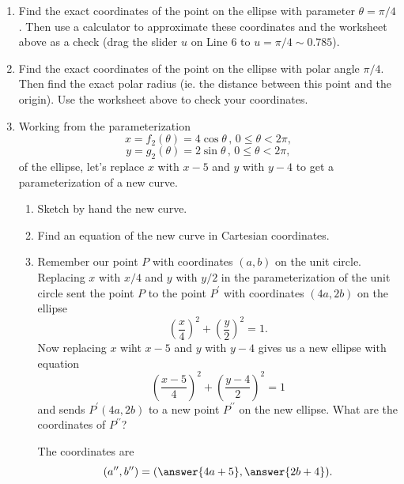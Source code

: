 \documentclass{ximera}
\begin{document}
\begin{example}
\begin{enumerate}
\item Find the exact coordinates of the point on the ellipse with parameter $\theta=\pi/4$. Then use a calculator to approximate these coordinates and the worksheet above as a check (drag the slider $u$ on Line 6 to $u=\pi/4 \sim 0.785$).

\item Find the exact coordinates of the point on the ellipse with polar angle $\pi/4$. Then find the exact polar radius (ie. the distance between this point and the origin). Use the worksheet above to check your coordinates.

\item Working from the parameterization 
\[ 
     x = f_2 (\theta) = 4\cos\theta \, , \, 0\leq \theta <2\pi ,
\]
\[
   y = g_2 (\theta) = 2\sin\theta \, , \, 0\leq \theta <2\pi ,
\]
of the ellipse, let's replace $x$ with $x-5$ and $y$ with $y-4$ to get a parameterization of a new curve.

\begin{enumerate}
\item Sketch by hand the new curve.

\item Find an equation of the new curve in Cartesian coordinates.

\item Remember our point $P$ with coordinates $(a,b)$ on the unit circle. Replacing $x$ with $x/4$ and $y$ with $y/2$ in the parameterization of the unit circle sent the point $P$ to the point $P^\prime$ with coordinates $(4a, 2b)$ on the ellipse
\[
  \left( \frac{x}{4} \right)^2 + \left( \frac{y}{2} \right)^2 = 1.
\]
Now replacing $x$ wiht $x-5$ and $y$ with $y-4$ gives us a new ellipse with equation
\[
  \left( \frac{x-5}{4} \right)^2 + \left( \frac{y-4}{2} \right)^2 = 1
\]
and sends $P^\prime(4a,2b)$ to a new point $P^{\prime\prime}$ on the new ellipse. What are the coordinates of $P^{\prime\prime}$?

The coordinates are 
\[
   (a^{\prime\prime} , b^{\prime\prime}) = (\answer{4a+5} , \answer{2b+4} ) .
\]


\end{enumerate}

\end{enumerate}
\end{example}
\end{document}

